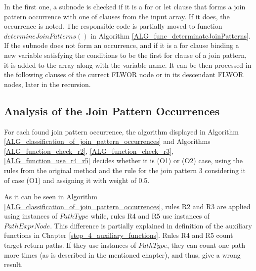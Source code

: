 In the first one, a subnode is checked if it is a for or let clause that forms a join pattern occurrence with one of clauses from the input array. If it does, the occurrence is noted. The responsible code is partially moved to function $determineJoinPatterns()$ in Algorithm \ref{ALG_func_determinateJoinPatterns}. If the subnode does not form an occurrence, and if it is a for clause binding a new variable satisfying the conditions to be the first for clause of a join pattern, it is added to the array along with the variable name. It can be then processed in the following clauses of the currect FLWOR node or in its descendant FLWOR nodes, later in the recursion.

\subsection{Analysis of the Join Pattern Occurrences}
For each found join pattern occurrence, the algorithm displayed in Algorithm \ref{ALG_classification_of_join_pattern_occurrences} and Algorithms \ref{ALG_function_check_r2}, \ref{ALG_function_check_r3}, \ref{ALG_function_use_r4_r5} decides whether it is (O1) or (O2) case, using the rules from the original method and the rule for the join pattern 3 considering it of case (O1) and assigning it with weight of 0.5.

As it can be seen in Algorithm \ref{ALG_classification_of_join_pattern_occurrences}, rules R2 and R3 are applied using instances of $PathType$ while, rules R4 and R5 use instances of $PathExprNode$. This difference is partially explained in definition of the auxiliary functions in Chapter \ref{step_4_auxiliary_functions}. Rules R4 and R5 count target return paths. If they use instances of $PathType$, they can count one path more times (as is described in the mentioned chapter), and thus, give a wrong result.

